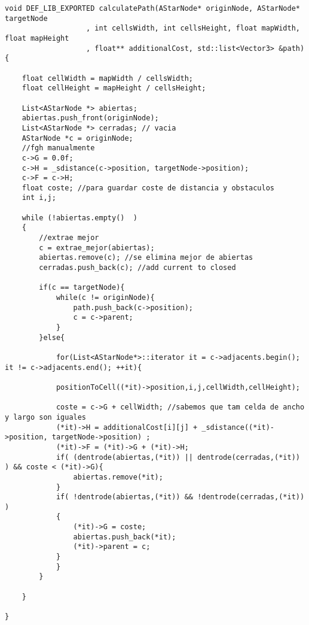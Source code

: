 \begin{lstlisting}
void DEF_LIB_EXPORTED calculatePath(AStarNode* originNode, AStarNode* targetNode
                   , int cellsWidth, int cellsHeight, float mapWidth, float mapHeight
                   , float** additionalCost, std::list<Vector3> &path) {
    
    float cellWidth = mapWidth / cellsWidth;
    float cellHeight = mapHeight / cellsHeight;
    
    List<AStarNode *> abiertas;
    abiertas.push_front(originNode);
    List<AStarNode *> cerradas; // vacia
    AStarNode *c = originNode;
    //fgh manualmente
    c->G = 0.0f; 
    c->H = _sdistance(c->position, targetNode->position);
    c->F = c->H;
    float coste; //para guardar coste de distancia y obstaculos
    int i,j;
    
    while (!abiertas.empty()  )
    {
        //extrae mejor 
        c = extrae_mejor(abiertas);
        abiertas.remove(c); //se elimina mejor de abiertas
        cerradas.push_back(c); //add current to closed
       
        if(c == targetNode){
            while(c != originNode){
                path.push_back(c->position);
                c = c->parent;
            }
        }else{

            for(List<AStarNode*>::iterator it = c->adjacents.begin(); it != c->adjacents.end(); ++it){
            
            positionToCell((*it)->position,i,j,cellWidth,cellHeight);
            
            coste = c->G + cellWidth; //sabemos que tam celda de ancho y largo son iguales
            (*it)->H = additionalCost[i][j] + _sdistance((*it)->position, targetNode->position) ;
            (*it)->F = (*it)->G + (*it)->H;
            if( (dentrode(abiertas,(*it)) || dentrode(cerradas,(*it)) ) && coste < (*it)->G){
                abiertas.remove(*it);
            }
            if( !dentrode(abiertas,(*it)) && !dentrode(cerradas,(*it)) )  
            {
                (*it)->G = coste;
                abiertas.push_back(*it);
                (*it)->parent = c;
            }
            }
        }
        
    }

}
\end{lstlisting}

\vspace{5mm}
